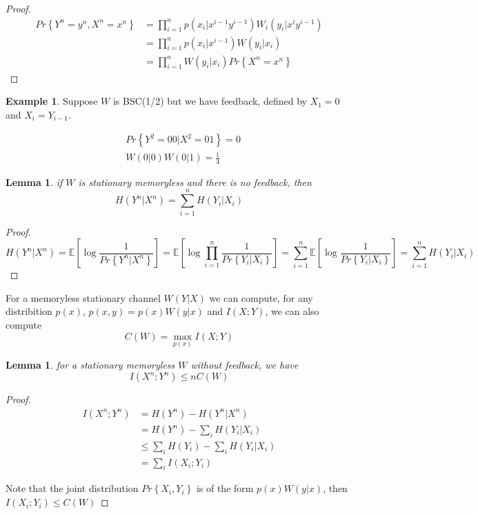 \documentclass[twoside]{article}
\newtheorem{lemma}[theorem]{Lemma}
\theoremstyle{definition} %
\newtheorem{example}{Example}
\renewcommand{\Pr}[1]{Pr\left\{#1\right\}}
\newcommand{\Ex}[1]{\mathbb{E}\left[#1\right]}
\begin{document}
\begin{proof}
  \begin{align*}
    \Pr{Y^n=y^n, X^n=x^n} &= \prod_{i=1}^n p(x_i|x^{i-1}y^{i-1})W_i(y_i|x^iy^{i-1})\\
    &= \prod_{i=1}^n p(x_i|x^{i-1})W(y_i|x_i)\\
    &= \prod_{i=1}^n W(y_i|x_i) \Pr{X^n=x^n}
  \end{align*}
\end{proof}

\begin{example}
  Suppose $W$ is BSC(1/2) but we have feedback, defined by $X_1=0$ and $X_i=Y_{i-1}$.

  \begin{align*}
    &\Pr{Y^2=00|X^2=01} = 0\\
    &W(0|0)W(0|1) = \frac 1 4
  \end{align*}

\end{example}

\begin{lemma}
  if $W$ is stationary memoryless and there is no feedback, then
  \[
    H(Y^n|X^n) = \sum_{i=1}^n H(Y_i|X_i)
  \]

\end{lemma}

\begin{proof}
  \[
    H(Y^n|X^n) = \Ex{\log \frac 1 {\Pr{Y^n|X^n}}}
    = \Ex{\log \prod_{i=1}^n \frac 1 {\Pr{Y_i|X_i}}}
    = \sum_{i=1}^n \Ex{\log \frac 1 {\Pr{Y_i|X_i}}}
    = \sum_{i=1}^n H(Y_i|X_i)
  \]
\end{proof}

For a memoryless stationary channel $W(Y|X)$ we can compute, for any
distribition $p(x)$, $p(x,y) = p(x)W(y|x)$ and $I(X;Y)$, we can also compute
\[
  C(W) = \max_{p(x)} I(X;Y)
\]

\begin{lemma}
  for a stationary memoryless $W$ without feedback, we have
  \[
    I(X^n;Y^n) \leq n C(W)
  \]
\end{lemma}


\begin{proof}
  \begin{align*}
    I(X^n;Y^n) &= H(Y^n) - H(Y^n|X^n)\\
    &= H(Y^n)- \sum_i H(Y_i|X_i)\\
    &\leq \sum_i H(Y_i) - \sum_i H(Y_i|X_i)\\
    &= \sum_i I(X_i;Y_i)
  \end{align*}

  Note that the joint distribution $\Pr{X_i,Y_i}$ is of the form $p(x)W(y|x)$, then $I(X_i;Y_i) \leq C(W)$
\end{proof}
\end{document}
